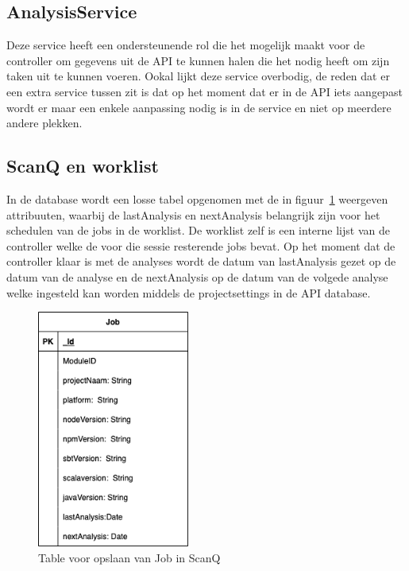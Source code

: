 \subsection{AnalysisService}\label{subsec:analysisservice}
Deze service heeft een ondersteunende rol die het mogelijk maakt voor de controller om gegevens uit de API te kunnen halen die het nodig heeft om  zijn taken uit te kunnen voeren. Ookal lijkt deze service overbodig, de reden dat er een extra service tussen zit is dat op het moment dat er in de API iets aangepast wordt er maar een enkele aanpassing nodig is in de service en niet op meerdere andere plekken.

\subsection{ScanQ en worklist}\label{subsec:scanq}
In de database wordt een losse tabel opgenomen met de in figuur~\ref{fig:scanQERD} weergeven attribuuten, waarbij de lastAnalysis en nextAnalysis belangrijk zijn voor het schedulen van de jobs in de worklist.
De worklist zelf is een interne lijst van de controller welke de voor die sessie resterende jobs bevat. Op het moment dat de controller klaar is met de analyses wordt de datum van lastAnalysis gezet op de datum van de analyse en de nextAnalysis op de datum van de volgede analyse welke ingesteld kan worden middels de projectsettings in de API database.
\begin{figure}[bth]
    \myfloatalign
    \includegraphics[width=5cm]{gfx/SOUPAPI-scanQERD}
    \caption{Table voor opslaan van Job in ScanQ}
    \label{fig:scanQERD}
\end{figure}
